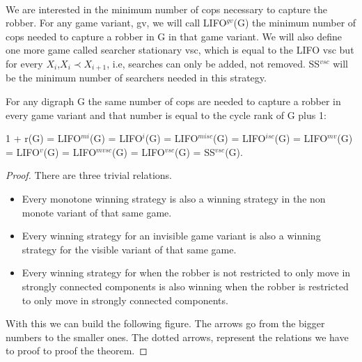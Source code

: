 \paragraph{}
We are interested in the minimum number of cops necessary to capture the robber. For any game variant, gv, we will call LIFO$^{gv}$(G) the minimum number of cops needed to capture a robber in G in that game variant. We will also define one more game called searcher stationary vsc, which is equal to the LIFO vsc but for every $X_i$,$X_i \prec X_{i+1}$, i.e, searches can only be added, not removed. SS$^{vsc}$ will be the minimum number of searchers needed in this strategy.

\begin{theorem}
For any digraph G the same number of cops are needed to capture a robber in every game variant and that number is equal to the cycle rank of G plus 1:

1 + r(G) = LIFO$^{mi}$(G) = LIFO$^{i}$(G) = LIFO$^{misc}$(G) = LIFO$^{isc}$(G) = LIFO$^{mv}$(G) = LIFO$^{v}$(G) = LIFO$^{mvsc}$(G) = LIFO$^{vsc}$(G) = SS$^{vsc}$(G).
\end{theorem}
\begin{proof}
There are three trivial relations.
\begin{itemize}
\item Every monotone winning strategy is also a winning strategy in the non monote variant of that same game.
\item Every winning strategy for an invisible game variant is also a winning strategy for the visible variant of that same game.
\item Every winning strategy for when the robber is not restricted to only move in strongly connected components is also winning when the robber is restricted to only move in strongly connected components.
\end{itemize}
With this we can build the following figure. The arrows go from the bigger numbers to the smaller ones. The dotted arrows, represent the relations we have to proof to proof the theorem.
\end{proof}
